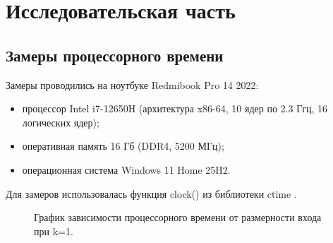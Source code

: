 \chapter{Исследовательская часть}

\section{Замеры процессорного времени}

Замеры проводились на ноутбуке Redmibook Pro 14 2022:
\begin{itemize}
	\item процессор Intel i7-12650H (архитектура x86-64, 10 ядер по 2.3 Ггц, 16 логических ядер);
	\item оперативная память 16 Гб (DDR4, 5200 МГц);
	\item операционная система Windows 11 Home 25H2.
\end{itemize}
Для замеров использовалась функция clock() из библиотеки ctime \cite[с.~288]{lit1}. 



\begin{figure}[!htbp]
	\centering
	\caption{График зависимости процессорного времени от размерности входа при k=1.}
\end{figure}
\FloatBarrier

